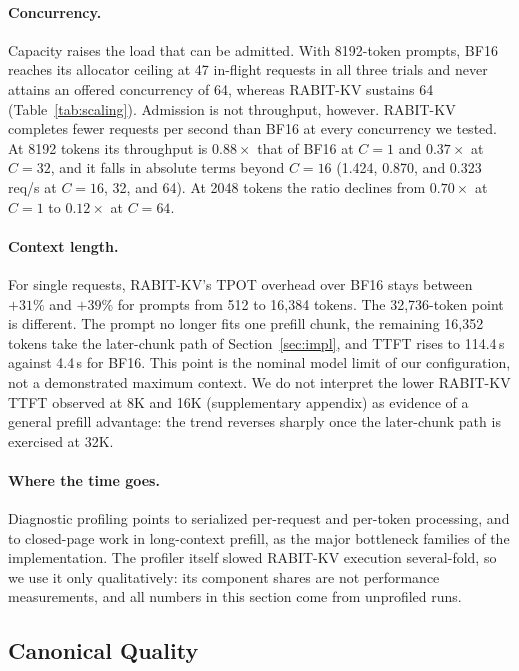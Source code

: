 \documentclass{article}
\begin{document}
\paragraph{Concurrency.}
Capacity raises the load that can be admitted. With 8192-token prompts, BF16 reaches its allocator
ceiling at 47 in-flight requests in all three trials and never attains an offered concurrency of 64,
whereas RABIT-KV sustains 64 (Table~\ref{tab:scaling}). Admission is not throughput, however. RABIT-KV
completes fewer requests per second than BF16 at every concurrency we tested. At 8192 tokens its
throughput is $0.88\times$ that of BF16 at $C{=}1$ and $0.37\times$ at $C{=}32$, and it falls in
absolute terms beyond $C{=}16$ (1.424, 0.870, and 0.323 req/s at $C{=}16$, 32, and 64). At 2048 tokens
the ratio declines from $0.70\times$ at $C{=}1$ to $0.12\times$ at $C{=}64$.

\paragraph{Context length.}
For single requests, RABIT-KV's TPOT overhead over BF16 stays between $+31\%$ and $+39\%$ for prompts
from 512 to 16,384 tokens. The 32,736-token point is different. The prompt no longer fits one prefill
chunk, the remaining 16,352 tokens take the later-chunk path of Section~\ref{sec:impl}, and TTFT rises
to 114.4\,s against 4.4\,s for BF16. This point is the nominal model limit of our configuration, not a
demonstrated maximum context. We do not interpret the lower RABIT-KV TTFT observed at 8K and 16K
(supplementary appendix) as evidence of a general prefill advantage: the trend reverses sharply once the later-chunk
path is exercised at 32K.

\paragraph{Where the time goes.}
Diagnostic profiling points to serialized per-request and per-token processing, and to closed-page work
in long-context prefill, as the major bottleneck families of the implementation. The profiler itself
slowed RABIT-KV execution several-fold, so we use it only qualitatively: its component shares are not
performance measurements, and all numbers in this section come from unprofiled runs.

\subsection{Canonical Quality}
\label{sec:quality}
\end{document}
